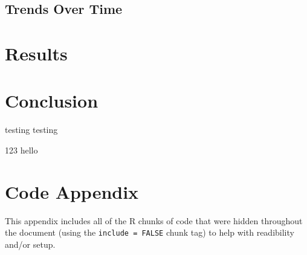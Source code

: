 \documentclass[12pt,twoside]{dukestatscithesis}
\theoremstyle{definition}
\theoremstyle{definition}
\theoremstyle{definition}
\theoremstyle{remark}
\begin{document}
\section{Trends Over Time}\label{trends-over-time}

\chapter{Results}\label{organization}

\chapter*{Conclusion}\label{conclusion}

testing testing

123 hello

\appendix

\chapter{Code Appendix}\label{code-appendix}

This appendix includes all of the R chunks of code that were hidden
throughout the document (using the \texttt{include\ =\ FALSE} chunk tag)
to help with readibility and/or setup.
\end{document}

